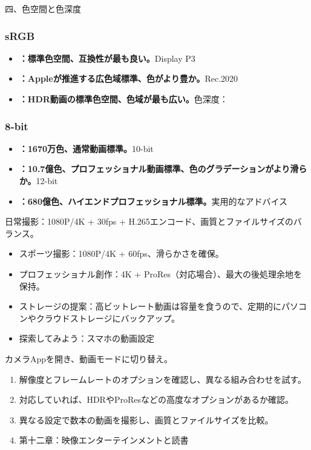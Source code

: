 四、色空間と色深度


\subsubsection*{sRGB}

\begin{itemize}
  \item \textbf{：標準色空間、互換性が最も良い。}Display P3
  \item \textbf{：Appleが推進する広色域標準、色がより豊か。}Rec.2020
  \item \textbf{：HDR動画の標準色空間、色域が最も広い。}色深度：
\end{itemize}

\subsubsection*{8-bit}

\begin{itemize}
  \item \textbf{：1670万色、通常動画標準。}10-bit
  \item \textbf{：10.7億色、プロフェッショナル動画標準、色のグラデーションがより滑らか。}12-bit
  \item \textbf{：680億色、ハイエンドプロフェッショナル標準。}実用的なアドバイス
\end{itemize}

\begin{tcbinfo}{日常撮影：1080P/4K + 30fps + H.265エンコード、画質とファイルサイズのバランス。}
\begin{itemize}
  \item スポーツ撮影：1080P/4K + 60fps、滑らかさを確保。
  \item プロフェッショナル創作：4K + ProRes（対応場合）、最大の後処理余地を保持。
  \item ストレージの提案：高ビットレート動画は容量を食うので、定期的にパソコンやクラウドストレージにバックアップ。
  \item 探索してみよう：スマホの動画設定
\end{itemize}

\end{tcbinfo}

\begin{tcbpractice}{カメラAppを開き、動画モードに切り替え。}
\begin{enumerate}
  \item 解像度とフレームレートのオプションを確認し、異なる組み合わせを試す。
  \item 対応していれば、HDRやProResなどの高度なオプションがあるか確認。
  \item 異なる設定で数本の動画を撮影し、画質とファイルサイズを比較。
  \item 第十二章：映像エンターテインメントと読書
\end{enumerate}

\end{tcbpractice}

